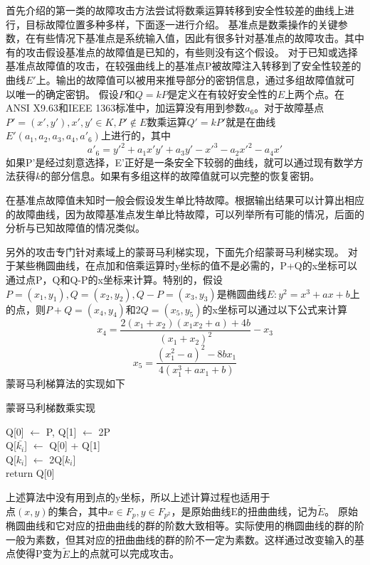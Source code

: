 \documentclass[a4paper,12pt]{article}
\begin{document}
\begin{CJK}{UTF8}{gkai}
首先介绍的第一类的故障攻击方法尝试将数乘运算转移到安全性较差的曲线上进行，目标故障位置多种多样，下面逐一进行介绍。
基准点是数乘操作的关键参数，在有些情况下基准点是系统输入值，因此有很多针对基准点的故障攻击。其中有的攻击假设基准点的故障值是已知的，有些则没有这个假设。
对于已知或选择基准点故障值的攻击，在较强曲线上的基准点P被故障注入转移到了安全性较差的曲线$E'$上。输出的故障值可以被用来推导部分的密钥信息，通过多组故障值就可以唯一的确定密钥。
假设$P$和$Q=kP$是定义在有较好安全性的$E$上两个点。在ANSI X9.63和IEEE 1363标准中，加运算没有用到参数$a_{6}$。对于故障基点$P' = (x',y'), x',y'\in K, P'\nin E$数乘运算$Q' = kP'$就是在曲线$E'(a_{1},a_{2},a_{3},a_{4},a'_{6})$上进行的，其中
$$a'_{6} = y'^{2} + a_{1}x'y' + a_{3}y' - x'^{3} - a_{2}x'^{2} - a_{4}x'$$
如果P'是经过刻意选择，E'正好是一条安全下较弱的曲线，就可以通过现有数学方法获得$k$的部分信息。如果有多组这样的故障值就可以完整的恢复密钥。

在基准点故障值未知时一般会假设发生单比特故障。根据输出结果可以计算出相应的故障曲线，因为故障基准点发生单比特故障，可以列举所有可能的情况，后面的分析与已知故障值的情况类似。

另外的攻击专门针对素域上的蒙哥马利梯实现，下面先介绍蒙哥马利梯实现。
对于某些椭圆曲线，在点加和倍乘运算时y坐标的值不是必需的，P+Q的x坐标可以通过点P，Q和Q-P的x坐标来计算。特别的，假设$P = (x_{1}, y_{1}), Q = (x_{2}, y_{2}), Q-P = (x_{3}, y_{3})$是椭圆曲线$E: y^{2} = x^{3} + ax + b$上的点，则$P+Q = (x_{4}, y_{4})$和$2Q = (x_{5}, y_{5})$的x坐标可以通过以下公式来计算
$$x_{4} = \frac{2(x_{1}+x_{2})(x_{1}x_{2}+a)+4b}{(x_{1}+x_{2})^{2}}-x_{3}$$
$$x_{5} = \frac{(x_{1}^{2}-a)^{2}-8bx_{1}}{4(x_{1}^{3}+ax_{1}+b)}$$
蒙哥马利梯算法的实现如下
\begin{algorithm}
\caption{蒙哥马利梯数乘实现}
Q[0] $\leftarrow$ P, Q[1] $\leftarrow$ 2P\\
{
Q[$\bar{k_{i}}$] $\leftarrow$ Q[0] + Q[1]\\
Q[$k_{i}$] $\leftarrow$ 2Q[$k_{i}$]\\
}
return Q[0]\\
\end{algorithm}
上述算法中没有用到点的y坐标，所以上述计算过程也适用于$\text{点}(x,y)\text{的集合，其中}x\in F_{p}, y\in F_{p^{2}}\text{，是原始曲线E的扭曲曲线，记为}\tilde{E}$。
原始椭圆曲线和它对应的扭曲曲线的群的阶数大致相等。实际使用的椭圆曲线的群的阶一般为素数，但其对应的扭曲曲线的群的阶不一定为素数。这样通过改变输入的基点使得P变为$\tilde{E}$上的点就可以完成攻击。


\end{CJK}
\end{document}
